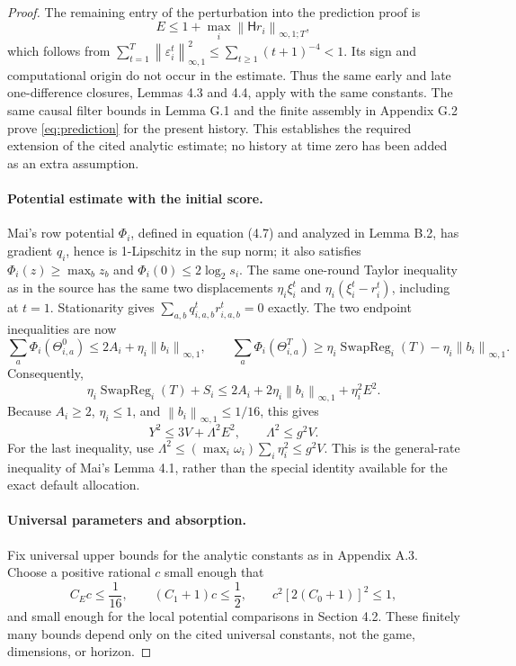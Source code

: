\documentclass[11pt]{article}
\newcommand{\SwapReg}{\operatorname{SwapReg}}
\newcommand{\norm}[1]{\left\lVert#1\right\rVert}
\newcommand{\rn}[1]{\norm{#1}_{\infty,1}}
\newcommand{\Pred}{\mathsf H}
\begin{document}
\begin{proof}
The remaining entry of the perturbation into the prediction proof is
\[
 E\leq1+\max_i\norm{\Pred r_i}_{\infty,1;T},
\]
which follows from
$\sum_{t=1}^T\rn{\varepsilon_i^t}^2\leq
\sum_{t\geq1}(t+1)^{-4}<1$.
Its sign and computational origin do not occur in the estimate.
Thus the same early and late one-difference closures, Lemmas 4.3 and
4.4, apply with the same constants.  The same causal filter bounds
in Lemma G.1 and the finite assembly in Appendix G.2 prove
\eqref{eq:prediction} for the present history.  This establishes the
required extension of the cited analytic estimate; no history at
time zero has been added as an extra assumption.

\paragraph{Potential estimate with the initial score.}
Mai's row potential $\Phi_i$, defined in equation (4.7) and analyzed
in Lemma B.2, has gradient $q_i$, hence is
1-Lipschitz in the sup norm; it also satisfies
$\Phi_i(z)\geq\max_bz_b$ and $\Phi_i(0)\leq2\log_2s_i$.
The same one-round Taylor inequality as in the source has the same
two displacements $\eta_i\xi_i^t$ and
$\eta_i(\xi_i^t-r_i^t)$, including at $t=1$.  Stationarity gives
$\sum_{a,b}q_{i,a,b}^tr_{i,a,b}^t=0$ exactly.  The two endpoint
inequalities are now
\[
 \sum_a\Phi_i(\Theta_{i,a}^0)
 \leq2A_i+\eta_i\rn{b_i},\qquad
 \sum_a\Phi_i(\Theta_{i,a}^T)
 \geq\eta_i\SwapReg_i(T)-\eta_i\rn{b_i}.
\]
Consequently,
\begin{equation}\label{eq:biasedenergy}
 \eta_i\SwapReg_i(T)+S_i
 \leq2A_i+2\eta_i\rn{b_i}+\eta_i^2E^2.
\end{equation}
Because $A_i\geq2$, $\eta_i\leq1$, and $\rn{b_i}\leq1/16$,
this gives
\[
 Y^2\leq3V+\Lambda^2E^2,\qquad
\Lambda^2\leq g^2V.
\]
For the last inequality, use
$\Lambda^2\leq(\max_i\omega_i)\sum_i\eta_i^2\leq g^2V$.
This is the general-rate inequality of Mai's Lemma 4.1, rather than
the special identity available for the exact default allocation.

\paragraph{Universal parameters and absorption.}
Fix universal upper bounds for the analytic constants as in
Appendix A.3.  Choose a positive rational $c$ small enough that
\[
 C_Ec\leq\frac1{16},\qquad
 (C_1+1)c\leq\frac12,\qquad
 c^2[2(C_0+1)]^2\leq1,
\]
and small enough for the local potential comparisons in Section 4.2.
These finitely many bounds depend only on the cited universal
constants, not the game, dimensions, or horizon.


\end{proof}
\end{document}
